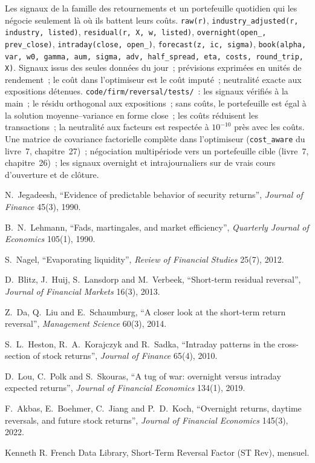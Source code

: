\begin{build}
 Les signaux de la famille des retournements et un portefeuille quotidien qui les négocie seulement là où ils battent leurs coûts.
 \texttt{raw(r)}, \texttt{industry\_adjusted(r, industry, listed)}, \texttt{residual(r, X, w, listed)},
\texttt{overnight(open\_, prev\_close)}, \texttt{intraday(close, open\_)}, \texttt{forecast(z, ic, sigma)},
\texttt{book(alpha, var, w0, gamma, aum, sigma, adv, half\_spread, eta, costs, round\_trip, X)}.
 Signaux issus des seules données du jour~; prévisions exprimées en unités de rendement~; le coût dans l'optimiseur est le coût imputé~; neutralité exacte aux
expositions détenues.
 \texttt{code/firm/reversal/tests/}~: les signaux vérifiés à la main~; le résidu orthogonal aux expositions~; sans coûts, le portefeuille est égal à la
solution moyenne--variance en forme close~; les coûts réduisent les transactions~; la neutralité aux facteurs est respectée à $10^{-10}$ près avec les coûts.
 Une matrice de covariance factorielle complète dans l'optimiseur (\texttt{cost\_aware} du livre~7, chapitre~27)~; négociation multipériode vers un portefeuille cible (livre~7,
chapitre~26)~; les signaux overnight et intrajournaliers sur de vrais cours d'ouverture et de clôture.
\end{build}

\begin{omsources}
\item N.~Jegadeesh, ``Evidence of predictable behavior of security returns'', \emph{Journal of Finance} 45(3), 1990.
\item B.~N.~Lehmann, ``Fads, martingales, and market efficiency'', \emph{Quarterly Journal of Economics} 105(1), 1990.
\item S.~Nagel, ``Evaporating liquidity'', \emph{Review of Financial Studies} 25(7), 2012.
\item D.~Blitz, J.~Huij, S.~Lansdorp and M.~Verbeek, ``Short-term residual reversal'', \emph{Journal of Financial Markets} 16(3), 2013.
\item Z.~Da, Q.~Liu and E.~Schaumburg, ``A closer look at the short-term return reversal'', \emph{Management Science} 60(3), 2014.
\item S.~L.~Heston, R.~A.~Korajczyk and R.~Sadka, ``Intraday patterns in the cross-section of stock returns'', \emph{Journal of Finance} 65(4), 2010.
\item D.~Lou, C.~Polk and S.~Skouras, ``A tug of war: overnight versus intraday expected returns'', \emph{Journal of Financial Economics} 134(1), 2019.
\item F.~Akbas, E.~Boehmer, C.~Jiang and P.~D.~Koch, ``Overnight returns, daytime reversals, and future stock returns'', \emph{Journal of Financial Economics}
145(3), 2022.
\item Kenneth R. French Data Library, Short-Term Reversal Factor (ST Rev), mensuel.
\end{omsources}


